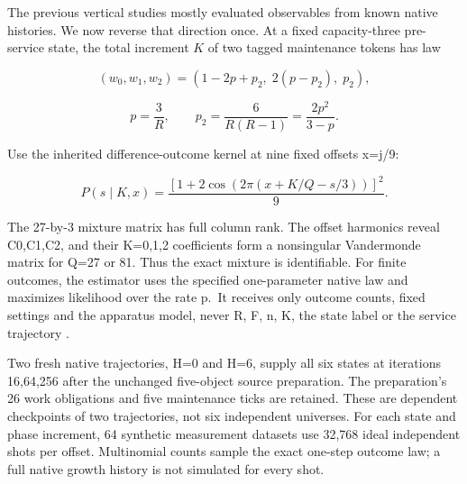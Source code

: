 \documentclass[11pt,a4paper]{article}
\begin{document}
The previous vertical studies mostly evaluated observables from known native histories. We now reverse that direction once. At a fixed capacity-three pre-service state, the total increment \(K\) of two tagged maintenance tokens has law

\begin{equation}\label{eq:20}
(w_0,w_1,w_2)=(1-2p+p_2,\;2(p-p_2),\;p_2),
\end{equation}

\begin{equation}\label{eq:21}
p=\frac3R,\qquad p_2=\frac6{R(R-1)}=\frac{2p^2}{3-p}.
\end{equation}

Use the inherited difference-outcome kernel at nine fixed offsets x=j/9:

\begin{equation}\label{eq:22}
P(s\mid K,x)=\frac{[1+2\cos(2\pi(x+K/Q-s/3))]^2}{9}.
\end{equation}

The 27-by-3 mixture matrix has full column rank. The offset harmonics reveal C0,C1,C2, and their K=0,1,2 coefficients form a nonsingular Vandermonde matrix for Q=27 or 81. Thus the exact mixture is identifiable. For finite outcomes, the estimator uses the specified one-parameter native law and maximizes likelihood over the rate p.~It receives only outcome counts, fixed settings and the apparatus model, never R, F, n, K, the state label or the service trajectory \cite{R39}.

Two fresh native trajectories, H=0 and H=6, supply all six states at iterations 16,64,256 after the unchanged five-object source preparation. The preparation's 26 work obligations and five maintenance ticks are retained. These are dependent checkpoints of two trajectories, not six independent universes. For each state and phase increment, 64 synthetic measurement datasets use 32,768 ideal independent shots per offset. Multinomial counts sample the exact one-step outcome law; a full native growth history is not simulated for every shot.
\end{document}
